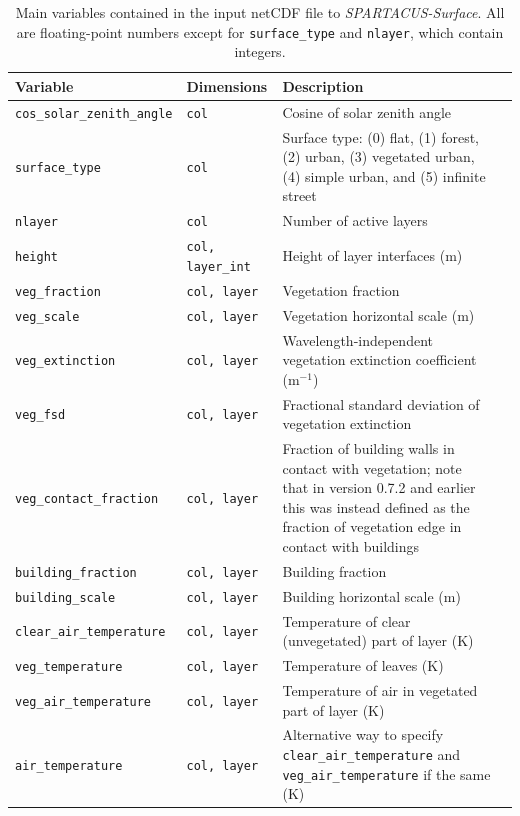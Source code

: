 \documentclass[a4,oneside]{article}
\def\tablesetup{\rowcolors{2}{light-gray}{light-gray}\small}
\def\codesize{\small}
\def\codetabsize{\footnotesize}
\def\spsurf{\emph{SPARTACUS-Surface}}
\def\code#1{{\codesize\texttt{#1}}}
\def\codetab#1{{\codetabsize\texttt{#1}}}
\begin{document}
\pagebreak
{
\tablesetup
\begin{longtable}{llLp{8cm}}%
\caption{\label{tab:invar}Main variables contained in the input netCDF
  file to \spsurf. All are floating-point numbers except for
  \code{surface\_type} and \code{nlayer}, which contain integers.}\\
%
\hline
Variable & Dimensions & Description \\
\hline
\codetab{cos\_solar\_zenith\_angle} & \codetab{col} & Cosine of solar zenith angle \\
\codetab{surface\_type} & \codetab{col} & Surface type: (0) flat, (1) forest, (2) urban, (3) vegetated urban, (4) simple urban, and (5) infinite street \\
\codetab{nlayer} & \codetab{col} & Number of active layers \\
\codetab{height} & \codetab{col, layer\_int} & Height of layer interfaces (m) \\
\codetab{veg\_fraction} & \codetab{col, layer} & Vegetation fraction \\
\codetab{veg\_scale} & \codetab{col, layer} & Vegetation horizontal scale (m) \\
\codetab{veg\_extinction} & \codetab{col, layer} & Wavelength-independent vegetation extinction coefficient (m$^{-1}$) \\
\codetab{veg\_fsd} & \codetab{col, layer} & Fractional standard deviation of vegetation extinction \\
\codetab{veg\_contact\_fraction} & \codetab{col, layer} & Fraction of building walls in contact with vegetation; note that in version 0.7.2 and earlier this was instead defined as the fraction of vegetation edge in contact with buildings \\
%
\codetab{building\_fraction} & \codetab{col, layer} & Building fraction \\
\codetab{building\_scale} & \codetab{col, layer} & Building horizontal scale (m) \\
%
\codetab{clear\_air\_temperature} & \codetab{col, layer} & Temperature of clear (unvegetated) part of layer (K) \\
\codetab{veg\_temperature} & \codetab{col, layer} & Temperature of leaves (K) \\
\codetab{veg\_air\_temperature} & \codetab{col, layer} & Temperature of air in vegetated part of layer (K) \\
\codetab{air\_temperature} & \codetab{col, layer} & Alternative way to specify \codetab{clear\_air\_temperature} and \codetab{veg\_air\_temperature} if the same (K) \\

\end{longtable}}
\end{document}
